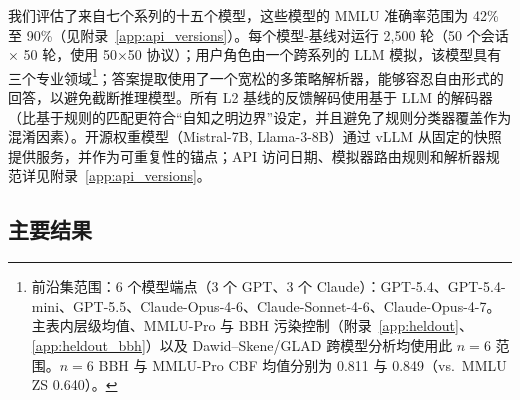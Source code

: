 \documentclass[11pt,a4paper,fontset=fandol]{ctexart}
\begin{document}
我们评估了来自七个系列的十五个模型，这些模型的 MMLU 准确率范围为 42\% 至 90\%（见附录~\ref{app:api_versions}）。每个模型-基线对运行 2,500 轮（50 个会话 $\times$ 50 轮，使用 50$\times$50 协议）；用户角色由一个跨系列的 LLM 模拟，该模型具有三个专业领域\footnote{前沿集范围：6 个模型端点（3 个 GPT、3 个 Claude）：GPT-5.4、GPT-5.4-mini、GPT-5.5、Claude-Opus-4-6、Claude-Sonnet-4-6、Claude-Opus-4-7。主表内层级均值、MMLU-Pro 与 BBH 污染控制（附录~\ref{app:heldout}、\ref{app:heldout_bbh}）以及 Dawid--Skene/GLAD 跨模型分析均使用此 $n{=}6$ 范围。$n{=}6$ BBH 与 MMLU-Pro CBF 均值分别为 0.811 与 0.849（vs.\ MMLU ZS 0.640）。}；答案提取使用了一个宽松的多策略解析器，能够容忍自由形式的回答，以避免截断推理模型。所有 L2 基线的反馈解码使用基于 LLM 的解码器（比基于规则的匹配更符合“自知之明边界”设定，并且避免了规则分类器覆盖作为混淆因素）。开源权重模型（Mistral-7B, Llama-3-8B）通过 vLLM 从固定的快照提供服务，并作为可重复性的锚点；API 访问日期、模拟器路由规则和解析器规范详见附录~\ref{app:api_versions}。

\subsection{主要结果}
\label{sec:results}
\end{document}
